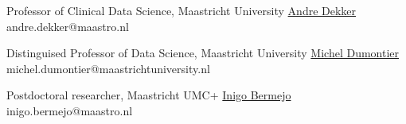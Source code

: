 
\begin{cventries}
    \cventry
    {Professor of Clinical Data Science, Maastricht University}
    {\href{https://www.maastrichtuniversity.nl/andre.dekker}{Andre Dekker}}
    {}
    {}
    {andre.dekker@maastro.nl}
    
    \cventry
    {Distinguised Professor of Data Science, Maastricht University}
    {\href{https://www.maastrichtuniversity.nl/michel.dumontier}{Michel Dumontier}}
    {}
    {}
    {michel.dumontier@maastrichtuniversity.nl}
    
    \cventry
    {Postdoctoral researcher, Maastricht UMC+}
    {\href{https://www.linkedin.com/in/ibermejo/?originalSubdomain=nl}{Inigo Bermejo}}
    {}{}
    {inigo.bermejo@maastro.nl}
    
\end{cventries}
